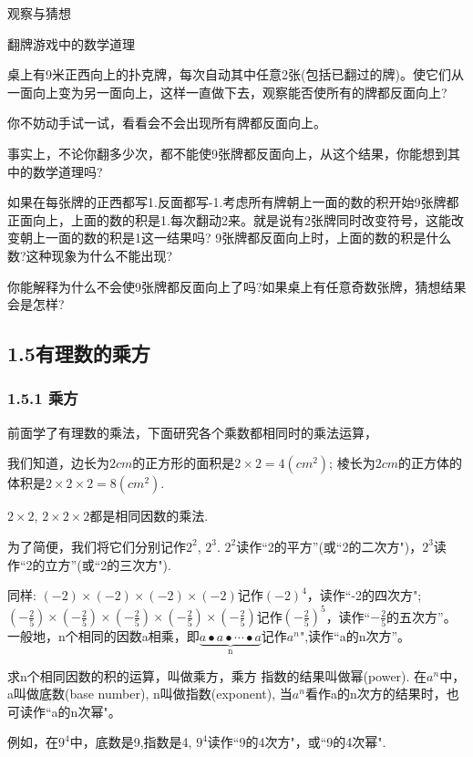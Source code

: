 \documentclass{article}
\begin{document}
观察与猜想

翻牌游戏中的数学道理

桌上有9米正西向上的扑克牌，每次自动其中任意2张(包括已翻过的牌)。使它们从一面向上变为另一面向上，这样一直做下去，观察能否使所有的牌都反面向上?

你不妨动手试一试，看看会不会出现所有牌都反面向上。

事实上，不论你翻多少次，都不能使9张牌都反面向上，从这个结果，你能想到其中的数学道理吗?

如果在每张牌的正西都写1.反面都写-1.考虑所有牌朝上一面的数的积开始9张牌都正面向上，上面的数的积是1.每次翻动2来。就是说有2张牌同时改变符号，这能改变朝上一面的数的积是1这一结果吗? 9张牌都反面向上时，上面的数的积是什么数?这种现象为什么不能出现?

你能解释为什么不会使9张牌都反面向上了吗?如果桌上有任意奇数张牌，猜想结果会是怎样?



\subsection{1.5有理数的乘方}
\subsubsection{1.5.1 乘方}

前面学了有理数的乘法，下面研究各个乘数都相同时的乘法运算，

我们知道，边长为$2cm$的正方形的面积是$2\times2=4(cm^2)$; 棱长为$2cm$的正方体的体积是$2\times2\times2=8(cm^2)$.

$2\times2$, $2\times2\times2$都是相同因数的乘法.

为了简便，我们将它们分别记作$2^2$, $2^3$. $2^2$读作“2的平方”(或“2的二次方")，$2^3$读作“2的立方”(或“2的三次方").

同样:
$(-2)\times(-2)\times(-2)\times(-2)$记作$(-2)^4$，读作“-2的四次方";$(-\frac{2}{5})\times(-\frac{2}{5})\times(-\frac{2}{5})\times(-\frac{2}{5})\times(-\frac{2}{5})$记作$(-\frac{2}{5})^5$，读作“$-\frac{2}{5}$的五次方”。
一般地，n个相同的因数a相乘，即$\underbrace{a\bullet a\bullet\cdots\bullet a}_{\text{n}} $记作$a^n$",读作“a的n次方”。

\begin{definition}
求n个相同因数的积的运算，叫做乘方，乘方  指数的结果叫做幂(power). 在$a^n$中，a叫做底数(base number), n叫做指数(exponent), 当$a^n$看作a的n次方的结果时，也可读作“a的n次幂"。
\end{definition}

例如，在$9^4$中，底数是9,指数是4, $9^4$读作“9的4次方"，或“9的4次幂".
\end{document}
